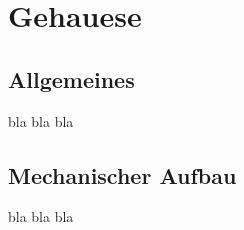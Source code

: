 \chapter{Gehauese}
\label{ch:concept}
\section{Allgemeines}
bla bla bla

\section{Mechanischer Aufbau}
bla bla bla